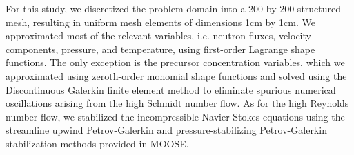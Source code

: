 For this study, we discretized the problem domain into a 200 by 200 structured
mesh, resulting in uniform mesh elements of dimensions 1cm by 1cm. We
approximated most of the relevant variables, i.e. neutron fluxes, velocity
components, pressure, and temperature, using first-order Lagrange shape
functions. The only exception is the precursor concentration variables, which
we approximated using zeroth-order monomial shape functions and solved using
the Discontinuous Galerkin finite element method to eliminate spurious
numerical oscillations arising from the high Schmidt number flow. As for the
high Reynolds number flow, we stabilized the incompressible Navier-Stokes
equations using the streamline upwind Petrov-Galerkin and pressure-stabilizing
Petrov-Galerkin stabilization methods \citep{peterson_overview_2017} provided
in \gls{MOOSE}.
